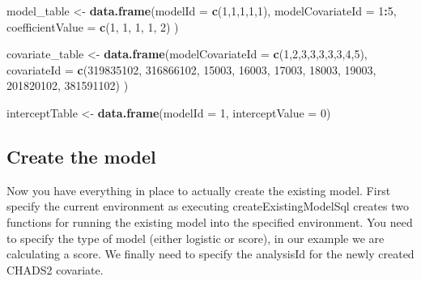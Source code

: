 \documentclass[]{article}
\newenvironment{Shaded}{\begin{snugshade}}{\end{snugshade}}
\newcommand{\KeywordTok}[1]{\textcolor[rgb]{0.13,0.29,0.53}{\textbf{#1}}}
\newcommand{\DataTypeTok}[1]{\textcolor[rgb]{0.13,0.29,0.53}{#1}}
\newcommand{\DecValTok}[1]{\textcolor[rgb]{0.00,0.00,0.81}{#1}}
\newcommand{\StringTok}[1]{\textcolor[rgb]{0.31,0.60,0.02}{#1}}
\newcommand{\OperatorTok}[1]{\textcolor[rgb]{0.81,0.36,0.00}{\textbf{#1}}}
\newcommand{\NormalTok}[1]{#1}
\begin{document}
\begin{Shaded}
\begin{Highlighting}[]
\NormalTok{model_table <-}\StringTok{ }\KeywordTok{data.frame}\NormalTok{(}\DataTypeTok{modelId =} \KeywordTok{c}\NormalTok{(}\DecValTok{1}\NormalTok{,}\DecValTok{1}\NormalTok{,}\DecValTok{1}\NormalTok{,}\DecValTok{1}\NormalTok{,}\DecValTok{1}\NormalTok{),}
                          \DataTypeTok{modelCovariateId =} \DecValTok{1}\OperatorTok{:}\DecValTok{5}\NormalTok{, }
                          \DataTypeTok{coefficientValue =} \KeywordTok{c}\NormalTok{(}\DecValTok{1}\NormalTok{, }\DecValTok{1}\NormalTok{, }\DecValTok{1}\NormalTok{, }\DecValTok{1}\NormalTok{, }\DecValTok{2}\NormalTok{)}
\NormalTok{                          )}

\NormalTok{covariate_table <-}\StringTok{ }\KeywordTok{data.frame}\NormalTok{(}\DataTypeTok{modelCovariateId =} \KeywordTok{c}\NormalTok{(}\DecValTok{1}\NormalTok{,}\DecValTok{2}\NormalTok{,}\DecValTok{3}\NormalTok{,}\DecValTok{3}\NormalTok{,}\DecValTok{3}\NormalTok{,}\DecValTok{3}\NormalTok{,}\DecValTok{3}\NormalTok{,}\DecValTok{4}\NormalTok{,}\DecValTok{5}\NormalTok{),}
                              \DataTypeTok{covariateId =} \KeywordTok{c}\NormalTok{(}\DecValTok{319835102}\NormalTok{, }\DecValTok{316866102}\NormalTok{, }
                                            \DecValTok{15003}\NormalTok{, }\DecValTok{16003}\NormalTok{, }\DecValTok{17003}\NormalTok{, }\DecValTok{18003}\NormalTok{, }\DecValTok{19003}\NormalTok{, }
                                            \DecValTok{201820102}\NormalTok{, }\DecValTok{381591102}\NormalTok{)}
\NormalTok{                              )}

\NormalTok{interceptTable <-}\StringTok{  }\KeywordTok{data.frame}\NormalTok{(}\DataTypeTok{modelId =} \DecValTok{1}\NormalTok{, }
                              \DataTypeTok{interceptValue =} \DecValTok{0}\NormalTok{)}
\end{Highlighting}
\end{Shaded}

\subsection{Create the model}\label{create-the-model}

Now you have everything in place to actually create the existing model.
First specify the current environment as executing
createExistingModelSql creates two functions for running the existing
model into the specified environment. You need to specify the type of
model (either logistic or score), in our example we are calculating a
score. We finally need to specify the analysisId for the newly created
CHADS2 covariate.
\end{document}
